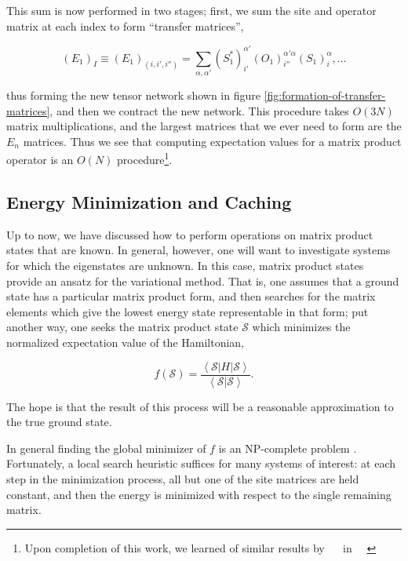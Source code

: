 \documentclass[12pt]{amsbook}
\theoremstyle{plain}
\theoremstyle{definition}
\theoremstyle{remark}
\newcommand{\cip}[2]{\left<#1|#2\right>}
\newcommand{\coip}[3]{\left<#1\left|#2\right|#3\right>}
\newcommand{\paren}[1]{\left(#1\right)}
\begin{document}
This sum is now performed in two stages;  first, we sum the site and operator matrix at each index to form ``transfer matrices'',

$$\paren{E_1}_I \equiv \paren{E_1}_{(i,i',i'')}
                 = \sum_{\alpha,\alpha'} \paren{S^*_1}^{\alpha'}_{i'}\paren{O_1}^{\alpha'\alpha}_{i''}\paren{S_1}^{\alpha}_i, \dots$$

\noindent thus forming the new tensor network shown in figure \ref{fig:formation-of-transfer-matrices}, and then we contract the new network.  This procedure takes $O(3N)$ matrix multiplications, and the largest matrices that we ever need to form are the $E_n$ matrices.  Thus we see that computing expectation values for a matrix product operator is an $O(N)$ procedure\footnote{Upon completion of this work, we learned of similar results by \underline{$\quad$} in \underline{$\quad$}}.
\subsection{Energy Minimization and Caching}

\label{caching}

Up to now, we have discussed how to perform operations on matrix product states that are known.  In general, however, one will want to investigate systems for which the eigenstates are unknown.  In this case, matrix product states provide an ansatz for the variational method.  That is, one assumes that a ground state has a particular matrix product form, and then searches for the matrix elements which give the lowest energy state representable in that form;  put another way, one seeks the matrix product state $\mathscr{S}$ which minimizes the normalized expectation value of the Hamiltonian,

$$f(\mathscr{S}) = \frac{\coip{\mathscr{S}}{H}{\mathscr{S}}}{\cip{\mathscr{S}}{\mathscr{S}}}.$$

\noindent The hope is that the result of this process will be a reasonable approximation to the true ground state.

In general finding the global minimizer of $f$ is an NP-complete problem \cite{quant-ph/0609051}.  Fortunately, a local search heuristic suffices for many systems of interest:  at each step in the minimization process, all but one of the site matrices are held constant, and then the energy is minimized with respect to the single remaining matrix.
\end{document}
